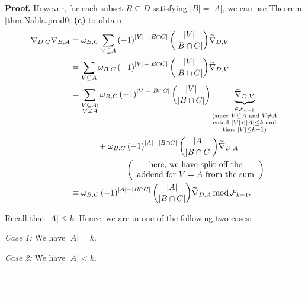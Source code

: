 \documentclass[numbers=enddot,12pt,final,onecolumn,notitlepage]{scrartcl}%
\numberwithin{exer}{subsection}
\theoremstyle{definition}
\newenvironment{proof}[1][Proof]{\noindent\textbf{#1.} }{\ \rule{0.5em}{0.5em}}
\let\sumnonlimits\sum
\renewcommand{\sum}{\sumnonlimits\limits}
\begin{document}
\begin{proof}
However, for each subset $B\subseteq D$ satisfying $\left\vert B\right\vert
=\left\vert A\right\vert $, we can use Theorem \ref{thm.Nabla.prod0}
\textbf{(c)} to obtain%
\begin{align}
\nabla_{D,C}\nabla_{B,A}  &  =\omega_{B,C}\sum_{V\subseteq A}\left(
-1\right)  ^{\left\vert V\right\vert -\left\vert B\cap C\right\vert }%
\dbinom{\left\vert V\right\vert }{\left\vert B\cap C\right\vert }%
\widetilde{\nabla}_{D,V}\nonumber\\
&  =\sum_{V\subseteq A}\omega_{B,C}\left(  -1\right)  ^{\left\vert
V\right\vert -\left\vert B\cap C\right\vert }\dbinom{\left\vert V\right\vert
}{\left\vert B\cap C\right\vert }\widetilde{\nabla}_{D,V}\nonumber\\
&  =\sum_{\substack{V\subseteq A;\\V\neq A}}\omega_{B,C}\left(  -1\right)
^{\left\vert V\right\vert -\left\vert B\cap C\right\vert }\dbinom{\left\vert
V\right\vert }{\left\vert B\cap C\right\vert }\underbrace{\widetilde{\nabla
}_{D,V}}_{\substack{\in\mathcal{F}_{k-1}\\\text{(since }V\subseteq A\text{ and
}V\neq A\\\text{entail }\left\vert V\right\vert <\left\vert A\right\vert \leq
k\text{ and}\\\text{thus }\left\vert V\right\vert \leq k-1\text{)}%
}}\nonumber\\
&  \ \ \ \ \ \ \ \ \ \ +\omega_{B,C}\left(  -1\right)  ^{\left\vert
A\right\vert -\left\vert B\cap C\right\vert }\dbinom{\left\vert A\right\vert
}{\left\vert B\cap C\right\vert }\widetilde{\nabla}_{D,A}\nonumber\\
&  \ \ \ \ \ \ \ \ \ \ \ \ \ \ \ \ \ \ \ \ \left(
\begin{array}
[c]{c}%
\text{here, we have split off the}\\
\text{addend for }V=A\text{ from the sum}%
\end{array}
\right) \nonumber\\
&  \equiv\omega_{B,C}\left(  -1\right)  ^{\left\vert A\right\vert -\left\vert
B\cap C\right\vert }\dbinom{\left\vert A\right\vert }{\left\vert B\cap
C\right\vert }\widetilde{\nabla}_{D,A}\operatorname{mod}\mathcal{F}_{k-1}.
\label{pf.prop.Fk.1.NN}%
\end{align}


Recall that $\left\vert A\right\vert \leq k$. Hence, we are in one of the
following two cases:

\textit{Case 1:} We have $\left\vert A\right\vert =k$.

\textit{Case 2:} We have $\left\vert A\right\vert <k$.


\end{proof}
\end{document}
